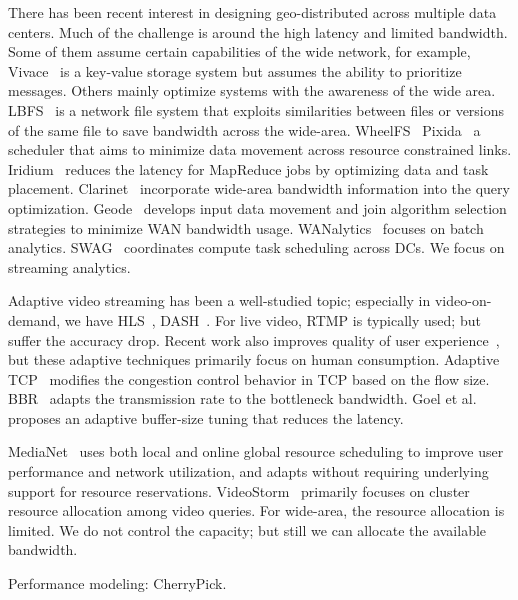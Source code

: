  There has been recent interest in designing
geo-distributed across multiple data centers. Much of the challenge is around
the high latency and limited bandwidth. Some of them assume certain capabilities
of the wide network, for example, Vivace~\cite{cho2012surviving} is a key-value
storage system but assumes the ability to prioritize messages. Others mainly
optimize systems with the awareness of the wide
area. LBFS~\cite{muthitacharoen2001low} is a network file system that exploits
similarities between files or versions of the same file to save bandwidth across
the wide-area. WheelFS~\cite{stribling2009flexible}
Pixida~\cite{kloudas2015pixida} a scheduler that aims to minimize data movement
across resource constrained links.  Iridium~\cite{pu2015low} reduces the latency
for MapReduce jobs by optimizing data and task
placement. Clarinet~\cite{viswanathan2016clarinet} incorporate wide-area
bandwidth information into the query
optimization. Geode~\cite{vulimiri2015global} develops input data movement and
join algorithm selection strategies to minimize WAN bandwidth
usage. WANalytics~\cite{vulimiri2015wananlytics} focuses on batch
analytics. SWAG~\cite{hung2015scheduling} coordinates compute task scheduling
across DCs. We focus on streaming analytics.


 Adaptive video streaming has been a
well-studied topic; especially in video-on-demand, we have
HLS~\cite{pantos2016http}, DASH~\cite{sodagar2011mpeg, michalos2012dynamic}. For
live video, RTMP is typically used; but suffer the accuracy drop. Recent work
also improves quality of user experience~\cite{yin2015control}, but these
adaptive techniques primarily focus on human consumption. Adaptive
TCP~\cite{wu2013adaptive} modifies the congestion control behavior in TCP based
on the flow size. BBR~\cite{cardwell2017bbr} adapts the transmission rate to the
bottleneck bandwidth. Goel et al.~\cite{goel2008low} proposes an adaptive
buffer-size tuning that reduces the latency.

 MediaNet~\cite{hicks2003user} uses both local
and online global resource scheduling to improve user performance and network
utilization, and adapts without requiring underlying support for resource
reservations. VideoStorm~\cite{zhang2017live} primarily focuses on cluster
resource allocation among video queries. For wide-area, the resource allocation
is limited. We do not control the capacity; but still we can allocate the
available bandwidth.

Performance modeling: CherryPick.



